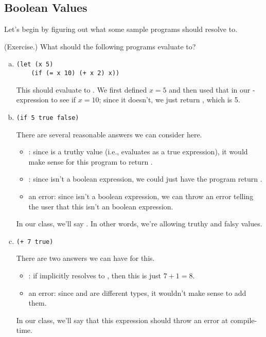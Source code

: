 \documentclass[letterpaper]{article}
\begin{document}
\subsection{Boolean Values}
Let's begin by figuring out what some sample programs should resolve to.
\begin{mdframed}
    (Exercise.) What should the following programs evaluate to? 
    \begin{enumerate}[a.]
        \item \begin{verbatim}
(let (x 5)
    (if (= x 10) (+ x 2) x))\end{verbatim}

        \begin{mdframed}
            This should evaluate to . We first defined $x = 5$ and then used that in our -expression to see if $x = 10$; since it doesn't, we just return , which is 5.  
        \end{mdframed}


        \item \begin{verbatim}
(if 5 true false)\end{verbatim}

        \begin{mdframed}
            There are several reasonable answers we can consider here. 
            \begin{itemize}
                \item {}: since  is a truthy value (i.e., evaluates as a true expression), it would make sense for this program to return .
                \item {}: since  isn't a boolean expression, we could just have the program return .
                \item an error: since  isn't a boolean expression, we can throw an error telling the user that this isn't an boolean expression. 
            \end{itemize}
            In our class, we'll say . In other words, we're allowing truthy and falsy values.
        \end{mdframed}


        \item \begin{verbatim}
(+ 7 true)\end{verbatim}

        \begin{mdframed}
            There are two answers we can have for this. 
            \begin{itemize}
                \item {}: if  implicitly resolves to , then this is just $7 + 1 = 8$.
                \item an error: since  and  are different types, it wouldn't make sense to add them. 
            \end{itemize}
            In our class, we'll say that this expression should throw an error at compile-time.
        \end{mdframed}


\end{enumerate}
\end{mdframed}
\end{document}
